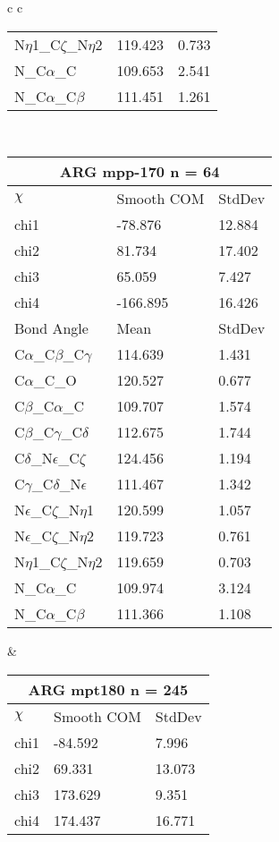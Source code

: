 \begin{longtable}{ c c }
\begin{tabular}{ l l l }
  N$\eta$1\_C$\zeta$\_N$\eta$2 & 119.423 & 0.733\\
  N\_C$\alpha$\_C & 109.653 & 2.541\\
  N\_C$\alpha$\_C$\beta$ & 111.451 & 1.261\\
  \bottomrule
  \end{tabular}
  \\
  \begin{tabular}{ l l l }
  \toprule
  \multicolumn{3}{c}{ARG \textbf{mpp-170} n = 64} \\ \toprule
  $\chi$       & Smooth COM & StdDev \\ \midrule
  chi1 & -78.876 & 12.884 \\ 
  chi2 & 81.734 & 17.402 \\ 
  chi3 & 65.059 & 7.427 \\ 
  chi4 & -166.895 & 16.426 \\ \midrule
  Bond Angle   & Mean     & StdDev \\ \midrule
  C$\alpha$\_C$\beta$\_C$\gamma$ & 114.639 & 1.431\\
  C$\alpha$\_C\_O & 120.527 & 0.677\\
  C$\beta$\_C$\alpha$\_C & 109.707 & 1.574\\
  C$\beta$\_C$\gamma$\_C$\delta$ & 112.675 & 1.744\\
  C$\delta$\_N$\epsilon$\_C$\zeta$ & 124.456 & 1.194\\
  C$\gamma$\_C$\delta$\_N$\epsilon$ & 111.467 & 1.342\\
  N$\epsilon$\_C$\zeta$\_N$\eta$1 & 120.599 & 1.057\\
  N$\epsilon$\_C$\zeta$\_N$\eta$2 & 119.723 & 0.761\\
  N$\eta$1\_C$\zeta$\_N$\eta$2 & 119.659 & 0.703\\
  N\_C$\alpha$\_C & 109.974 & 3.124\\
  N\_C$\alpha$\_C$\beta$ & 111.366 & 1.108\\
  \bottomrule
  \end{tabular}
  &
  \begin{tabular}{ l l l }
  \toprule
  \multicolumn{3}{c}{ARG \textbf{mpt180} n = 245} \\ \toprule
  $\chi$       & Smooth COM & StdDev \\ \midrule
  chi1 & -84.592 & 7.996 \\ 
  chi2 & 69.331 & 13.073 \\ 
  chi3 & 173.629 & 9.351 \\ 
  chi4 & 174.437 & 16.771 \\ \midrule

\end{tabular}
\end{longtable}

